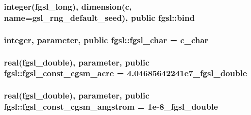 \subsubsection[{bind}]{\setlength{\rightskip}{0pt plus 5cm}integer({\bf fgsl\+\_\+long}), dimension(c, name=\textquotesingle{}gsl\+\_\+rng\+\_\+default\+\_\+seed\textquotesingle{}), public fgsl\+::bind}\label{namespacefgsl_a64406a5e119fa92e47b1adcddb152e91}
\hypertarget{namespacefgsl_a12911ae4a4462f8e892d903081e77ab4}{}
\subsubsection[{fgsl\+\_\+char}]{\setlength{\rightskip}{0pt plus 5cm}integer, parameter, public fgsl\+::fgsl\+\_\+char = c\+\_\+char}\label{namespacefgsl_a12911ae4a4462f8e892d903081e77ab4}
\hypertarget{namespacefgsl_a6417ace541dc0310036197a333495c36}{}
\subsubsection[{fgsl\+\_\+const\+\_\+cgsm\+\_\+acre}]{\setlength{\rightskip}{0pt plus 5cm}real({\bf fgsl\+\_\+double}), parameter, public fgsl\+::fgsl\+\_\+const\+\_\+cgsm\+\_\+acre = 4.\+04685642241e7\+\_\+fgsl\+\_\+double}\label{namespacefgsl_a6417ace541dc0310036197a333495c36}
\hypertarget{namespacefgsl_aedfe01763a71e3f82c2dee8a2586b442}{}
\subsubsection[{fgsl\+\_\+const\+\_\+cgsm\+\_\+angstrom}]{\setlength{\rightskip}{0pt plus 5cm}real({\bf fgsl\+\_\+double}), parameter, public fgsl\+::fgsl\+\_\+const\+\_\+cgsm\+\_\+angstrom = 1e-\/8\+\_\+fgsl\+\_\+double}\label{namespacefgsl_aedfe01763a71e3f82c2dee8a2586b442}
\hypertarget{namespacefgsl_af1dd23df42a3363f75423e5d3ff79cde}{}
